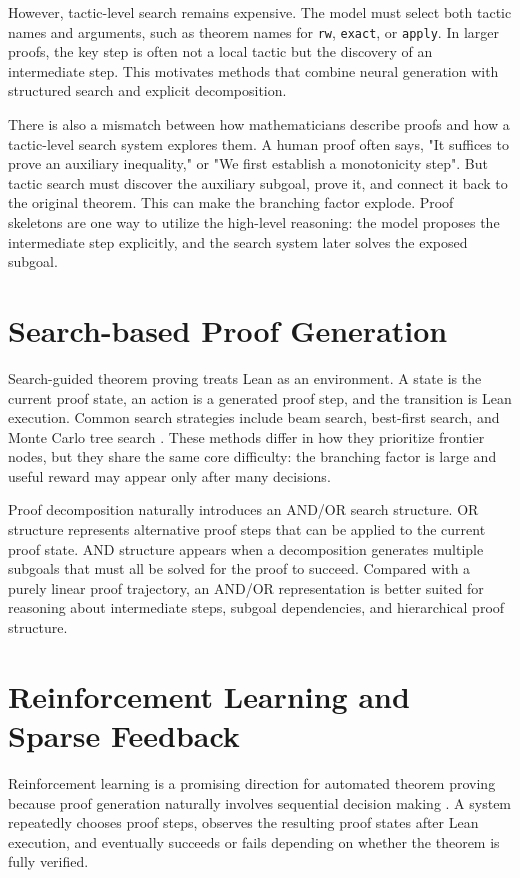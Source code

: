 \documentclass[en]{uet_awesome_thesis/uet-awesome-thesis}
\begin{document}
However, tactic-level search remains expensive. The model must select both tactic names and arguments, such as theorem names for \texttt{rw}, \texttt{exact}, or \texttt{apply}. In larger proofs, the key step is often not a local tactic but the discovery of an intermediate step. This motivates methods that combine neural generation with structured search and explicit decomposition.

There is also a mismatch between how mathematicians describe proofs and how a tactic-level search
system explores them. A human proof often says, "It suffices to prove an auxiliary inequality," or "We
first establish a monotonicity step". But tactic search must discover the auxiliary subgoal, prove it, and connect it back to the original theorem.
This can make the branching factor explode. Proof
skeletons are one way to utilize the high-level reasoning: the model proposes the intermediate
step explicitly, and the search system later solves the exposed subgoal.

\section{Search-based Proof Generation}

Search-guided theorem proving treats Lean as an environment. A state is the current proof state, an action is a generated proof step, and the transition is Lean execution. Common search strategies include beam search, best-first search, and Monte Carlo tree search \citep{polu2020gptf,lample2022hypertree,yang2023leandojo}. These methods differ in how they prioritize frontier nodes, but they share the same core difficulty: the branching factor is large and useful reward may appear only after many decisions.

Proof decomposition naturally introduces an AND/OR search structure. OR structure represents alternative proof steps that can be applied to the current proof state. AND structure appears when a decomposition generates multiple subgoals that must all be solved for the proof to succeed. Compared with a purely linear proof trajectory, an AND/OR representation is better suited for reasoning about intermediate steps, subgoal dependencies, and hierarchical proof structure.

\section{Reinforcement Learning and Sparse Feedback}
Reinforcement learning is a promising direction for automated theorem proving because proof generation naturally involves sequential decision making \citep{kaliszyk2018reinforcement,bansal2019holist}. A system repeatedly chooses proof steps, observes the resulting proof states after Lean execution, and eventually succeeds or fails depending on whether the theorem is fully verified.
\end{document}
